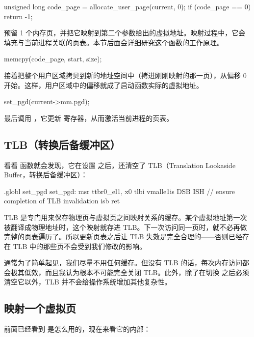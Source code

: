 \begin{ccode}
	unsigned long code_page = allocate_user_page(current, 0);
	if (code_page == 0)	{
		return -1;
	}
\end{ccode}

 预留 1 个内存页，并把它映射到第二个参数给出的虚拟地址。映射过程中，它会填充与当前进程关联的页表。本节后面会详细研究这个函数的工作原理。

\begin{ccode}
	memcpy(code_page, start, size);
\end{ccode}

接着把整个用户区域拷贝到新的地址空间中（拷进刚刚映射的那一页），从偏移 0 开始。这样，用户区域中的偏移就成了启动函数实际的虚拟地址。

\begin{ccode}
	set_pgd(current->mm.pgd);
\end{ccode}

最后调用 ，它更新  寄存器，从而激活当前进程的页表。

\subsection{TLB（转换后备缓冲区）}

看看  函数就会发现，它在设置  之后，还清空了 TLB（Translation Lookaside Buffer，转换后备缓冲区）：

\begin{asmcode}
.globl set_pgd
set_pgd:
	msr	ttbr0_el1, x0
	tlbi vmalle1is
	DSB ISH              // ensure completion of TLB invalidation
	isb
	ret
\end{asmcode}

TLB 是专门用来保存物理页与虚拟页之间映射关系的缓存。某个虚拟地址第一次被翻译成物理地址时，这个映射就存进 TLB。下一次访问同一页时，就不必再做完整的页表遍历了。所以更新页表之后让 TLB 失效是完全合理的——否则已经存在 TLB 中的那些页不会受到我们修改的影响。

通常为了简单起见，我们尽量不用任何缓存。但没有 TLB 的话，每次内存访问都会极其低效，而且我认为根本不可能完全关闭 TLB。此外，除了在切换  之后必须清空它以外，TLB 并不会给操作系统增加其他复杂性。

\subsection{映射一个虚拟页}

前面已经看到  是怎么用的，现在来看它的内部：

